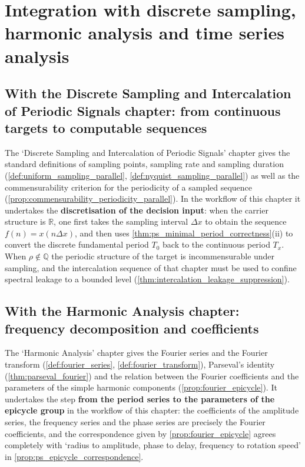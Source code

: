 \section{Integration with discrete sampling, harmonic analysis and time series analysis}\label{sec:ps_integration}

\subsection{With the Discrete Sampling and Intercalation of Periodic Signals chapter: from continuous targets to computable sequences}

The `Discrete Sampling and Intercalation of Periodic Signals' chapter gives the standard definitions of sampling points, sampling rate and sampling duration (\cref{def:uniform_sampling_parallel}, \cref{def:nyquist_sampling_parallel}) as well as the commensurability criterion for the periodicity of a sampled sequence (\cref{prop:commensurability_periodicity_parallel}). In the workflow of this chapter it undertakes the \textbf{discretisation of the decision input}: when the carrier structure is $\mathbb{R}$, one first takes the sampling interval $\Delta x$ to obtain the sequence $f(n)=x(n\Delta x)$, and then uses \cref{thm:ps_minimal_period_correctness}(ii) to convert the discrete fundamental period $T_0$ back to the continuous period $T_x$. When $\rho\notin\mathbb{Q}$ the periodic structure of the target is incommensurable under sampling, and the intercalation sequence of that chapter must be used to confine spectral leakage to a bounded level (\cref{thm:intercalation_leakage_suppression}).

\subsection{With the Harmonic Analysis chapter: frequency decomposition and coefficients}

The `Harmonic Analysis' chapter gives the Fourier series and the Fourier transform (\cref{def:fourier_series}, \cref{def:fourier_transform}), Parseval's identity (\cref{thm:parseval_fourier}) and the relation between the Fourier coefficients and the parameters of the simple harmonic components (\cref{prop:fourier_epicycle}). It undertakes the step \textbf{from the period series to the parameters of the epicycle group} in the workflow of this chapter: the coefficients of the amplitude series, the frequency series and the phase series are precisely the Fourier coefficients, and the correspondence given by \cref{prop:fourier_epicycle} agrees completely with `radius to amplitude, phase to delay, frequency to rotation speed' in \cref{prop:ps_epicycle_correspondence}.

